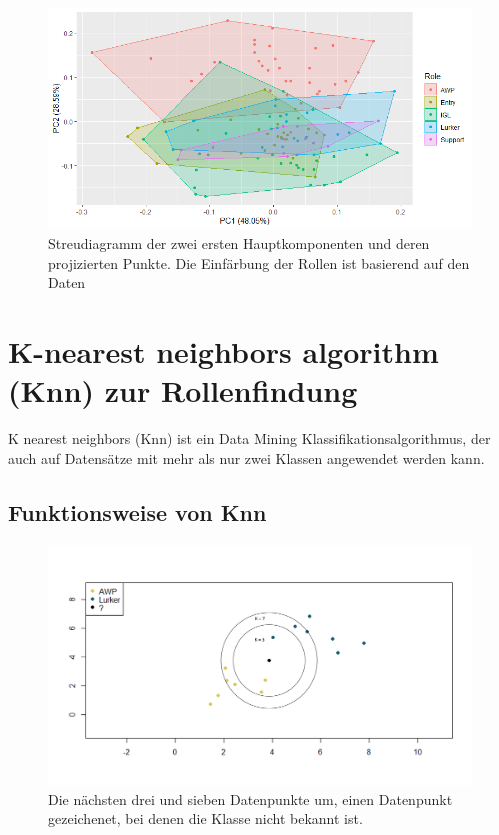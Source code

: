 \documentclass[envcountsame, envcountchap, deutsch]{i-studis}
\begin{document}
\vspace{1ex}
\begin{figure}
    \includegraphics[width=\textwidth]{pc_plotted_roles_with_frame.png}
    \caption{Streudiagramm der zwei ersten Hauptkomponenten und deren projizierten Punkte. Die Einfärbung der Rollen ist basierend auf den Daten}\label{fig:first_two_pc_plotted}
\end{figure}

\section{K-nearest neighbors algorithm (Knn) zur Rollenfindung}
K nearest neighbors (Knn) ist ein Data Mining Klassifikationsalgorithmus, der auch auf Datensätze mit mehr als nur zwei Klassen angewendet werden kann.

\subsection{Funktionsweise von Knn}
\vspace{1ex}
\begin{figure}
    \includegraphics[width=\textwidth]{knn_circles.png}
    \caption{Die nächsten drei und sieben Datenpunkte um, einen Datenpunkt gezeichenet, bei denen die Klasse nicht bekannt ist.}\label{fig:knn_circles}
\end{figure}
\end{document}
